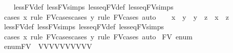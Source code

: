\begin{isabellebody}
\ \ \isamarkupfalse%
\ less{\isacharunderscore}{\kern0pt}FV{\isacharunderscore}{\kern0pt}def\ less{\isacharunderscore}{\kern0pt}FV{\isachardot}{\kern0pt}simps\ less{\isacharunderscore}{\kern0pt}eq{\isacharunderscore}{\kern0pt}FV{\isacharunderscore}{\kern0pt}def\ less{\isacharunderscore}{\kern0pt}eq{\isacharunderscore}{\kern0pt}FV{\isachardot}{\kern0pt}simps\ \isanewline
\ \ \isamarkupfalse%
\ {\isacharparenleft}{\kern0pt}cases\ x\ rule{\isacharcolon}{\kern0pt}\ FV{\isacharunderscore}{\kern0pt}cases{\isacharparenright}{\kern0pt}{\isacharparenleft}{\kern0pt}cases\ y\ rule{\isacharcolon}{\kern0pt}\ FV{\isacharunderscore}{\kern0pt}cases{\isacharcomma}{\kern0pt}\ auto{\isacharparenright}{\kern0pt}{\isacharplus}{\kern0pt}\isanewline
\ \ \isamarkupfalse%
\ {\isachardoublequoteopen}x\ {\isasymle}\ y\ {\isasymLongrightarrow}\ y\ {\isasymle}\ z\ {\isasymLongrightarrow}\ x\ {\isasymle}\ z{\isachardoublequoteclose}\isanewline
\ \ \isamarkupfalse%
\ less{\isacharunderscore}{\kern0pt}FV{\isacharunderscore}{\kern0pt}def\ less{\isacharunderscore}{\kern0pt}FV{\isachardot}{\kern0pt}simps\ less{\isacharunderscore}{\kern0pt}eq{\isacharunderscore}{\kern0pt}FV{\isacharunderscore}{\kern0pt}def\ less{\isacharunderscore}{\kern0pt}eq{\isacharunderscore}{\kern0pt}FV{\isachardot}{\kern0pt}simps\ \isanewline
\ \ \isamarkupfalse%
\ {\isacharparenleft}{\kern0pt}cases\ x\ rule{\isacharcolon}{\kern0pt}\ FV{\isacharunderscore}{\kern0pt}cases{\isacharparenright}{\kern0pt}{\isacharparenleft}{\kern0pt}cases\ y\ rule{\isacharcolon}{\kern0pt}\ FV{\isacharunderscore}{\kern0pt}cases{\isacharcomma}{\kern0pt}\ auto{\isacharparenright}{\kern0pt}{\isacharplus}{\kern0pt}\isanewline
{}\isamarkupfalse%
%
\endisatagproof
{\isafoldproof}%
%
\isadelimproof
\isanewline
%
\endisadelimproof
{}\isamarkupfalse%
\isanewline
\isanewline
{}\isamarkupfalse%
\ FV\ {\isacharcolon}{\kern0pt}{\isacharcolon}{\kern0pt}enum\isanewline
{}\isanewline
\isanewline
{}\isamarkupfalse%
\ {\isachardoublequoteopen}enum{\isacharunderscore}{\kern0pt}FV\ {\isasymequiv}\ {\isacharbrackleft}{\kern0pt}V{}{\isacharcomma}{\kern0pt}V{}{\isacharcomma}{\kern0pt}V{}{\isacharcomma}{\kern0pt}V{}{\isacharcomma}{\kern0pt}V{}{\isacharcomma}{\kern0pt}V{}{\isacharcomma}{\kern0pt}V{}{\isacharcomma}{\kern0pt}V{}{\isacharcomma}{\kern0pt}V{}{\isacharcomma}{\kern0pt}V{}{}{\isacharbrackright}{\kern0pt}{\isachardoublequoteclose}\isanewline

\end{isabellebody}
